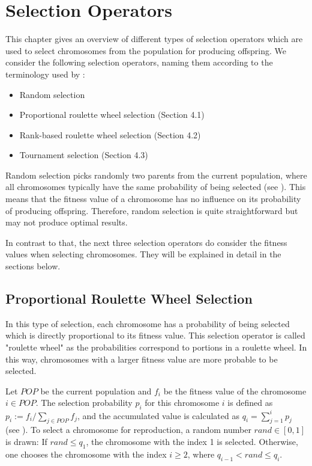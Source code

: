 \section{Selection Operators}
\label{sec:selection}
This chapter gives an overview of different types of selection operators which are used to select chromosomes from the population for producing offspring. We consider the following selection operators, naming them according to the terminology used by \citeauthor{razali2011genetic} \cite{razali2011genetic}:

\begin{itemize}
	\item Random selection
	\item Proportional roulette wheel selection (Section 4.1)
	\item Rank-based roulette wheel selection (Section 4.2)
	\item Tournament selection (Section 4.3)
\end{itemize}

Random selection picks randomly two parents from the current population, where all chromosomes typically have the same probability of being selected (see \cite{knust2020script}). This means that the fitness value of a chromosome has no influence on its probability of producing offspring. Therefore, random selection is quite straightforward but may not produce optimal results.\par 

In contrast to that, the next three selection operators do consider the fitness values when selecting chromosomes. They will be explained in detail in the sections below.

\subsection{Proportional Roulette Wheel Selection}
\label{subsec:proportional}

In this type of selection, each chromosome has a probability of being selected which is directly proportional to its fitness value. This selection operator is called "roulette wheel" as the probabilities correspond to portions in a roulette wheel. In this way, chromosomes with a larger fitness value are more probable to be selected.\par 

Let $POP$ be the current population and $f_{i}$ be the fitness value of the chromosome $i \in POP$. The selection probability $p_{i}$ for this chromosome $i$ is defined as $p_{i} := f_{i}/ \sum_{j\in POP} f_{j}$, and the accumulated value is calculated as $q_{i} = \sum_{j = 1}^{i} p_{j}$ (see \cite{knust2020script}). To select a chromosome for reproduction, a random number $rand \in [0, 1]$ is drawn: If $rand \leq q_{1}$, the chromosome with the index 1  is selected. Otherwise, one chooses the chromosome with the index $i \geq 2$, where $q_{i - 1} < rand \leq  q_{i}$.\par 

